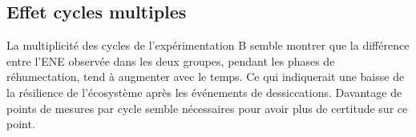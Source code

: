 %
%
%
%
%
%
%

\subsection{Effet cycles multiples}

La multiplicité des cycles de l'expérimentation B semble montrer que la différence entre l'ENE observée dans les deux groupes, pendant les phases de réhumectation, tend à augmenter avec le temps.
Ce qui indiquerait une baisse de la résilience de l'écosystème après les événements de dessiccations.
Davantage de points de mesures par cycle semble nécessaires pour avoir plus de certitude sur ce point.

